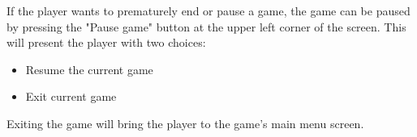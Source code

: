 If the player wants to prematurely end or pause a game, the game can be paused by pressing the "Pause game" button at the upper left corner of the screen. This will present the player with two choices:
\noindent
\begin{itemize}
\item Resume the current game
\item Exit current game
\end{itemize} 
Exiting the game will bring the player to the game's main menu screen.